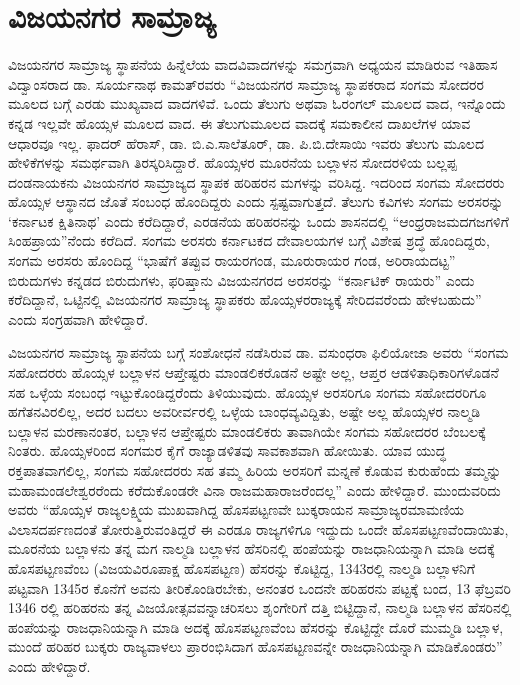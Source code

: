 \section{ವಿಜಯನಗರ ಸಾಮ್ರಾಜ್ಯ}

\vskip -6pt

ವಿಜಯನಗರ ಸಾಮ್ರಾಜ್ಯ ಸ್ಥಾಪನೆಯ ಹಿನ್ನೆಲೆಯ ವಾದವಿವಾದಗಳನ್ನು ಸಮಗ್ರವಾಗಿ ಅಧ್ಯಯನ ಮಾಡಿರುವ ಇತಿಹಾಸ ವಿದ್ವಾಂಸರಾದ ಡಾ. ಸೂರ್ಯನಾಥ ಕಾಮತ್​ರವರು “ವಿಜಯನಗರ ಸಾಮ್ರಾಜ್ಯ ಸ್ಥಾಪಕರಾದ ಸಂಗಮ ಸೋದರರ ಮೂಲದ ಬಗ್ಗೆ ಎರಡು ಮುಖ್ಯವಾದ ವಾದಗಳಿವೆ. ಒಂದು ತೆಲುಗು ಅಥವಾ ಓರಂಗಲ್​ ಮೂಲದ ವಾದ, ಇನ್ನೊಂದು ಕನ್ನಡ ಇಲ್ಲವೇ ಹೊಯ್ಸಳ ಮೂಲದ ವಾದ. ಈ ತೆಲುಗುಮೂಲದ ವಾದಕ್ಕೆ ಸಮಕಾಲೀನ ದಾಖಲೆಗಳ ಯಾವ ಆಧಾರವೂ ಇಲ್ಲ. ಫಾದರ್​ ಹೆರಾಸ್​, ಡಾ. ಬಿ.ಎ.ಸಾಲೆತೂರ್​, ಡಾ. ಪಿ.ಬಿ.ದೇಸಾಯಿ ಇವರು ತೆಲುಗು ಮೂಲದ ಹೇಳಿಕೆಗಳನ್ನು ಸಮರ್ಥವಾಗಿ ತಿರಸ್ಕರಿಸಿದ್ದಾರೆ. ಹೊಯ್ಸಳರ ಮೂರನೆಯ ಬಲ್ಲಾಳನ ಸೋದರಳಿಯ ಬಲ್ಲಪ್ಪ ದಂಡನಾಯಕನು ವಿಜಯನಗರ ಸಾಮ್ರಾಜ್ಯದ ಸ್ಥಾಪಕ ಹರಿಹರನ ಮಗಳನ್ನು ವರಿಸಿದ್ದ. ಇದರಿಂದ ಸಂಗಮ ಸೋದರರು ಹೊಯ್ಸಳ ಆಸ್ಥಾನದ ಜೊತೆ ಸಂಬಂಧ ಹೊಂದಿದ್ದರು ಎಂದು ಸ್ಪಷ್ಟವಾಗುತ್ತದೆ. ತೆಲುಗು ಕವಿಗಳು ಸಂಗಮ ಅರಸರನ್ನು ‘ಕರ್ನಾಟಕ ಕ್ಷಿತಿನಾಥ’ ಎಂದು ಕರೆದಿದ್ದಾರೆ, ಎರಡನೆಯ ಹರಿಹರನನ್ನು ಒಂದು ಶಾಸನದಲ್ಲಿ “ಆಂಧ್ರರಾಜಮದಗಜಗಳಿಗೆ ಸಿಂಹಪ್ರಾಯ”ನೆಂದು ಕರೆದಿದೆ. ಸಂಗಮ ಅರಸರು ಕರ್ನಾಟಕದ ದೇವಾಲಯಗಳ ಬಗ್ಗೆ ವಿಶೇಷ ಶ್ರದ್ಧೆ ಹೊಂದಿದ್ದರು, ಸಂಗಮ ಅರಸರು ಹೊಂದಿದ್ದ “ಭಾಷೆಗೆ ತಪ್ಪುವ ರಾಯರಗಂಡ, ಮೂರುರಾಯರ ಗಂಡ, ಅರಿರಾಯದಟ್ಟ” ಬಿರುದುಗಳು ಕನ್ನಡದ ಬಿರುದುಗಳು, ಫರಿಷ್ತಾನು ವಿಜಯನಗರದ ಅರಸರನ್ನು “ಕರ್ನಾಟಿಕ್​ ರಾಯರು” ಎಂದು ಕರೆದಿದ್ದಾನೆ, ಒಟ್ಟಿನಲ್ಲಿ ವಿಜಯನಗರ ಸಾಮ್ರಾಜ್ಯ ಸ್ಥಾಪಕರು ಹೊಯ್ಸಳರರಾಜ್ಯಕ್ಕೆ ಸೇರಿದವರೆಂದು ಹೇಳಬಹುದು” ಎಂದು ಸಂಗ್ರಹವಾಗಿ ಹೇಳಿದ್ದಾರೆ.

ವಿಜಯನಗರ ಸಾಮ್ರಾಜ್ಯ ಸ್ಥಾಪನೆಯ ಬಗ್ಗೆ ಸಂಶೋಧನೆ ನಡೆಸಿರುವ ಡಾ. ವಸುಂಧರಾ ಫಿಲಿಯೋಜಾ ಅವರು “ಸಂಗಮ ಸಹೋದರರು ಹೊಯ್ಸಳ ಬಲ್ಲಾಳನ ಆಪ್ತೇಷ್ಟರು ಮಾಂಡಲಿಕರೊಡನೆ ಅಷ್ಟೇ ಅಲ್ಲ, ಆಪ್ತರ ಆಡಳಿತಾಧಿಕಾರಿಗಳೊಡನೆ ಸಹ ಒಳ್ಳೆಯ ಸಂಬಂಧ ಇಟ್ಟುಕೊಂಡಿದ್ದರೆಂದು ತಿಳಿಯುವುದು. ಹೊಯ್ಸಳ ಅರಸರಿಗೂ ಸಂಗಮ ಸಹೋದರರಿಗೂ ಹಗೆತನವಿರಲಿಲ್ಲ, ಅದರ ಬದಲು ಅವರೀರ್ವರಲ್ಲಿ ಒಳ್ಳೆಯ ಬಾಂಧವ್ಯವಿದ್ದಿತು, ಅಷ್ಟೇ ಅಲ್ಲ ಹೊಯ್ಸಳರ ನಾಲ್ಮಡಿ ಬಲ್ಲಾಳನ ಮರಣಾನಂತರ, ಬಲ್ಲಾಳನ ಆಪ್ತೇಷ್ಟರು ಮಾಂಡಲಿಕರು ತಾವಾಗಿಯೇ ಸಂಗಮ ಸಹೋದರರ ಬೆಂಬಲಕ್ಕೆ ನಿಂತರು. ಹೊಯ್ಸಳರಿಂದ ಸಂಗಮರ ಕೈಗೆ ರಾಜ್ಯಾಡಳಿತವು ಸಾವಕಾಶವಾಗಿ ಹೋಯಿತು. ಯಾವ ಯುದ್ಧ ರಕ್ತಪಾತವಾಗಲಿಲ್ಲ, ಸಂಗಮ ಸಹೋದರರು ಸಹ ತಮ್ಮ ಹಿರಿಯ ಅರಸರಿಗೆ ಮನ್ನಣೆ ಕೊಡುವ ಕುರುಹೆಂದು ತಮ್ಮನ್ನು ಮಹಾಮಂಡಲೇಶ್ವರರೆಂದು ಕರೆದುಕೊಂಡರೇ ವಿನಾ ರಾಜಮಹಾರಾಜರೆಂದಲ್ಲ” ಎಂದು ಹೇಳಿದ್ದಾರೆ. ಮುಂದುವರಿದು ಅವರು “ಹೊಯ್ಸಳ ರಾಜ್ಯಲಕ್ಷ್ಮಿಯ ಮುಖವಾಗಿದ್ದ ಹೊಸಪಟ್ಟಣವೇ ಬುಕ್ಕರಾಯನ ಸಾಮ್ರಾಜ್ಯರಮಾಮಣಿಯ ವಿಲಾಸದರ್ಪಣದಂತೆ ತೋರುತ್ತಿರುವಂತಿದ್ದರೆ ಈ ಎರಡೂ ರಾಜ್ಯಗಳಿಗೂ ಇದ್ದುದು ಒಂದೇ ಹೊಸಪಟ್ಟಣವೆಂದಾಯಿತು, ಮೂರನೆಯ ಬಲ್ಲಾಳನು ತನ್ನ ಮಗ ನಾಲ್ಮಡಿ ಬಲ್ಲಾಳನ ಹೆಸರಿನಲ್ಲಿ ಹಂಪೆಯನ್ನು ರಾಜಧಾನಿಯನ್ನಾಗಿ ಮಾಡಿ ಅದಕ್ಕೆ ಹೊಸಪಟ್ಟಣವೆಂಬ (ವಿಜಯವಿರೂಪಾಕ್ಷ ಹೊಸಪಟ್ಟಣ) ಹೆಸರನ್ನು ಕೊಟ್ಟಿದ್ದ, 1343ರಲ್ಲಿ ನಾಲ್ಮಡಿ ಬಲ್ಲಾಳನಿಗೆ ಪಟ್ಟವಾಗಿ 1345ರ ಕೊನೆಗೆ ಅವನು ತೀರಿಕೊಂಡಿರಬೇಕು, ಅನಂತರ ಒಂದನೇ ಹರಿಹರನು ಪಟ್ಟಕ್ಕೆ ಬಂದ, 13 ಫೆಬ್ರವರಿ 1346 ರಲ್ಲಿ ಹರಿಹರನು ತನ್ನ ವಿಜಯೋತ್ಸವವನ್ನಾಚರಿಸಲು ಶೃಂಗೇರಿಗೆ ದತ್ತಿ ಬಿಟ್ಟಿದ್ದಾನೆ, ನಾಲ್ಮಡಿ ಬಲ್ಲಾಳನ ಹೆಸರಿನಲ್ಲಿ ಹಂಪೆಯನ್ನು ರಾಜಧಾನಿಯನ್ನಾಗಿ ಮಾಡಿ ಅದಕ್ಕೆ ಹೊಸಪಟ್ಟಣವೆಂಬ ಹೆಸರನ್ನು ಕೊಟ್ಟಿದ್ದೇ ದೊರೆ ಮುಮ್ಮಡಿ ಬಲ್ಲಾಳ, ಮುಂದೆ ಹರಿಹರ ಬುಕ್ಕರು ರಾಜ್ಯವಾಳಲು ಪ್ರಾರಂಭಿಸಿದಾಗ ಹೊಸಪಟ್ಟಣವನ್ನೇ ರಾಜಧಾನಿಯನ್ನಾಗಿ ಮಾಡಿಕೊಂಡರು” ಎಂದು ಹೇಳಿದ್ದಾರೆ.

